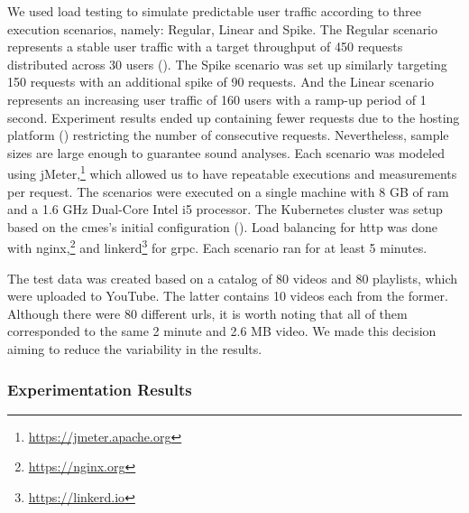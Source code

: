 We used load testing to simulate predictable user traffic according to three execution scenarios, namely: Regular, Linear and Spike. The Regular scenario represents a stable user traffic with a target throughput of 450 requests distributed across 30 users (). The Spike scenario was set up similarly targeting 150 requests with an additional spike of 90 requests. And the Linear scenario represents an increasing user traffic of 160 users with a ramp-up period of 1 second. Experiment results ended up containing fewer requests due to the hosting platform () restricting the number of consecutive requests. Nevertheless, sample sizes are large enough to guarantee sound analyses. Each scenario was modeled using jMeter,\footnote{\url{https://jmeter.apache.org}} which allowed us to have repeatable executions and measurements per request. The scenarios were executed on a single machine with 8 GB of \gls{ram} and a 1.6 GHz Dual-Core Intel i5 processor. The Kubernetes cluster was setup based on the \gls{cmes}'s initial configuration (). %
Load balancing for \gls{http} was done with nginx,\footnote{\url{https://nginx.org}} and linkerd\footnote{\url{https://linkerd.io}} for \acrshort{grpc}. Each scenario ran for at least 5 minutes.

The test data was created based on a catalog of 80 videos and 80 playlists, which were uploaded to YouTube. The latter contains 10 videos each from the former. Although there were 80 different \acrshort{url}s, it is worth noting that all of them corresponded to the same 2 minute and 2.6 MB video. We made this decision aiming to reduce the variability in the results.

\subsubsection{Experimentation Results}
\label{par:evaluation--im-architecture-experiment-results}

